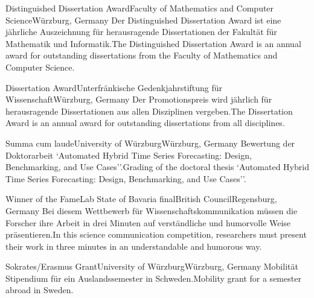 \begin{cventries}
	{Distinguished Dissertation Award}{Faculty of Mathematics and Computer Science}{Würzburg, Germany}%
    {}%
    {Der Distinguished Dissertation Award ist eine jährliche Auszeichnung für herausragende Dissertationen der Fakultät für Mathematik und Informatik.}{The Distinguished Dissertation Award is an annual award for outstanding dissertations from the Faculty of Mathematics and Computer Science.}

	{Dissertation Award}{Unterfränkische Gedenkjahrstiftung für Wissenschaft}{Würzburg, Germany}%
    {}%
    {Der Promotionspreis wird jährlich für herausragende Dissertationen aus allen Disziplinen vergeben.}{The Dissertation Award is an annual award for outstanding dissertations from all disciplines.}


	{Summa cum laude}{University of Würzburg}{Würzburg, Germany}%
    {}%
    {Bewertung der Doktorarbeit `Automated Hybrid Time Series Forecasting: Design, Benchmarking, and Use Cases''.}{Grading of the doctoral thesis `Automated Hybrid Time Series Forecasting: Design, Benchmarking, and Use Cases''.}

	{Winner of the FameLab State of Bavaria final}{British Council}{Regensburg, Germany}%
    {}%
    {Bei diesem Wettbewerb für Wissenschaftskommunikation müssen die Forscher ihre Arbeit in drei Minuten auf verständliche und humorvolle Weise präsentieren.}{In this science communication competition, researchers must present their work in three minutes in an understandable and humorous way.}

	{Sokrates/Erasmus Grant}{University of Würzburg}{Würzburg, Germany}%
    {}%
    {Mobilität Stipendium für ein Auslandssemester in Schweden.}{Mobility grant for a semester abroad in Sweden.}


\end{cventries}

